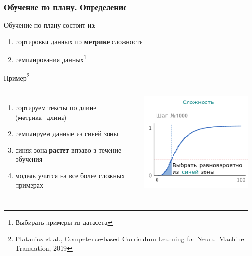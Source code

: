 \documentclass{beamer}
\begin{document}
\begin{frame}
	\frametitle{Обучение по плану. Определение}
	
	Обучение по плану состоит из:
		\begin{enumerate}
			\item сортировки данных по {\bf метрике} сложности
			\item семплирования данных\footnote{Выбирать примеры из датасета}
		\end{enumerate}

	Пример\footnote{Platanios et al., Competence-based Curriculum Learning for Neural Machine Translation, 2019}
	\begin{columns}
		\begin{enumerate}
			\item сортируем тексты по длине (метрика=длина)
			\item семплируем данные из синей зоны
			\item синяя зона {\bf растет} вправо в течение обучения
			\item модель учится на все более сложных примерах
		\end{enumerate}
		\includegraphics[scale=0.8]{acl19_algo.png}
	\end{columns}
\end{frame}
\end{document}
